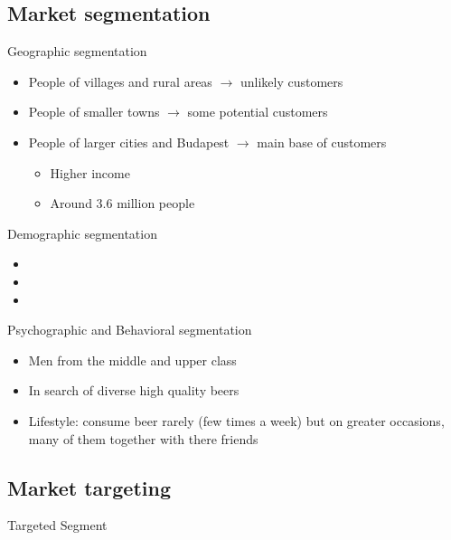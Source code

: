 \documentclass[aspectratio=43]{beamer}
\begin{document}
\subsection{Market segmentation}
\begin{frame}{Geographic segmentation}
   \begin{itemize}
      \item People of villages and rural areas $\rightarrow$ unlikely customers
      \item People of smaller towns $\rightarrow$ some potential customers
      \item People of larger cities and Budapest $\rightarrow$ main base of customers
      \begin{itemize}
         \item Higher income
         \item Around 3.6 million people
      \end{itemize}
   \end{itemize}

\end{frame}

\begin{frame}{Demographic segmentation}
   \begin{itemize}
      \item
      \item
      \item
   \end{itemize}
\end{frame}

\begin{frame}{Psychographic and Behavioral segmentation}
   \begin{itemize}
      \item Men from the middle and upper class
      \item In search of diverse high quality beers
      \item Lifestyle: consume beer rarely (few times a week) but on greater occasions, many of them together with there friends
   \end{itemize}
\end{frame}



\subsection{Market targeting}
\begin{frame}{Targeted Segment}

\end{frame}
\end{document}
